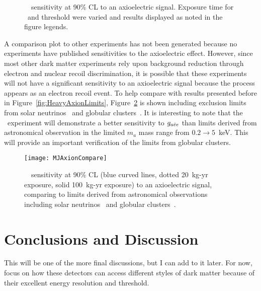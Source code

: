 			\begin{figure}
				\centering
				\def\figheight{0.41\textheight}
				\caption[\MJ~\minmod~sensitivity at 90\% CL to an axioelectric signal]{
				\MJ~\minmod~sensitivity at 90\% CL to an axioelectric signal.  Exposure time for \hthree~and threshold were varied and results displayed as noted
				in the figure legends.}
				\label{fig:MJSensitivityToAxion}
			\end{figure}	
				
	A comparison plot to other experiments has not been generated because no experiments have published sensitivities to the axioelectric effect.  However, since most other dark matter experiments rely upon background reduction through electron and nuclear recoil discrimination, it is possible that these experiments will not have a significant sensitivity to an axioelectric signal because the process appears as an electron recoil event.  To help compare with results presented before in Figure~\ref{fig:HeavyAxionLimits}, Figure~\ref{fig:MJSensitivityToHeavyAxionsCompare} is shown including exclusion limits from solar neutrinos~\cite{Gondolo09} and globular clusters~\cite{Raffelt95}.  It is interesting to note that the \MJ~experiment will demonstrate a better sensitivity to $g_{a\bar{e}e}$ than limits derived from astronomical observation in the limited $m_{a}$ mass range from $0.2\to5$~keV.  This will provide an important verification of the limits from globular clusters.
					
			\begin{figure}
				\centering
				\texttt{[image: MJAxionCompare]}
				\caption{\MJ~\minmod~sensitivity at 90\% CL (blue curved lines, dotted 20~kg-yr exposure, solid 100~kg-yr exposure) to an axioelectric signal, 
				comparing to limits derived from astronomical observations including solar neutrinos~\cite{Gondolo09} and globular clusters~\cite{Raffelt95}.}
				\label{fig:MJSensitivityToHeavyAxionsCompare}
			\end{figure}							

	\section{Conclusions and Discussion}
	\label{sec:OtherLowEnergyConclusions}	
	
	
	
	This will be one of the more final discussions, but I can add to it later.  For now, focus on how these detectors can access different styles of dark matter because of their excellent energy resolution and threshold.  